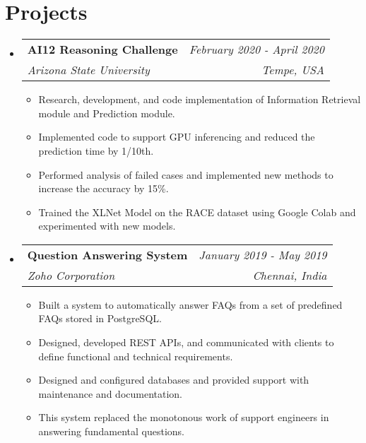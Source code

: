 \documentclass[letterpaper,11pt]{article}
\makeatletter
\newcommand{\resumeSubheading}[4]{
  \vspace{-1pt}\item
    \begin{tabular*}{0.97\textwidth}[t]{l@{\extracolsep{\fill}}r}
      \textbf{#1} & #2 \\
      \textit{\small#3} & \textit{\small #4} \\
    \end{tabular*}\vspace{-5pt}
}
\newcommand{\resumeSubHeadingListStart}{\begin{itemize}[leftmargin=*]}
\newcommand{\resumeSubHeadingListEnd}{\end{itemize}}
\newcommand{\resumeItemListStart}{\begin{itemize}}
\newcommand{\resumeItemListEnd}{\end{itemize}\vspace{-5pt}}
\makeatother
\begin{document}
\section{Projects}
    \resumeSubHeadingListStart
    \resumeSubheading
        {AI12 Reasoning Challenge}{\textit{February 2020 - April 2020}}
        {Arizona State University}{Tempe, USA}
            \resumeItemListStart
                \item{Research, development, and code implementation of Information Retrieval module and Prediction module.} 
                \item{Implemented code to support GPU inferencing and reduced the prediction time by 1/10th.}
                \item{Performed analysis of failed cases and implemented new methods to increase the accuracy by 15\%.}
                \item{Trained the XLNet Model on the RACE dataset using Google Colab and experimented with new models.}
            \resumeItemListEnd
    \resumeSubheading
        {Question Answering System}{\textit{January 2019 - May 2019}}
        {Zoho Corporation}{Chennai, India}
            \resumeItemListStart
                \item{Built a system to automatically answer FAQs from a set of predefined FAQs stored in PostgreSQL.}
                \item{Designed, developed REST APIs, and communicated with clients to define functional and technical requirements.}
                \item{Designed and configured databases and provided support with maintenance and documentation.}
                \item{This system replaced the monotonous work of support engineers in answering fundamental questions.}
            \resumeItemListEnd
    \resumeSubHeadingListEnd
 
\end{document}
